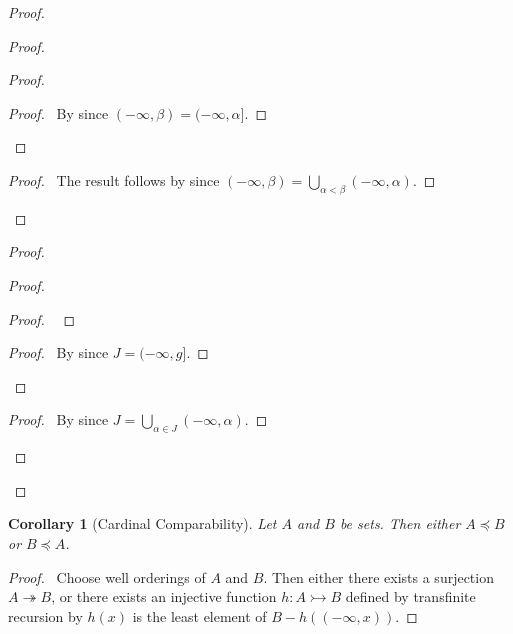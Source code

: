 \documentclass{book}
\let\qed\relax
\newtheorem{cor}{Corollary}[ax]
\theoremstyle{definition}
\begin{document}
\begin{proof}
\begin{proof}
	\begin{proof}
		\begin{proof}
			\pf\ By  since $(-\infty, \beta) = (-\infty, \alpha]$.
		\end{proof}
	\end{proof}
	\begin{proof}
		\pf\ The result follows by  since $(-\infty, \beta) = \bigcup_{\alpha < \beta} (-\infty, \alpha)$.
	\end{proof}
\end{proof}
\begin{proof}
	\begin{proof}
		\begin{proof}
			\pf\ 
		\end{proof}
		\begin{proof}
			\pf\ By  since $J = (-\infty, g]$.
		\end{proof}
	\end{proof}
	\begin{proof}
		\pf\ By  since $J = \bigcup_{\alpha \in J} (-\infty, \alpha)$.
	\end{proof}
\end{proof}
\qed
\end{proof}

\begin{cor}[Cardinal Comparability]
Let $A$ and $B$ be sets. Then either $A \preccurlyeq B$ or $B \preccurlyeq A$.
\end{cor}

\begin{proof}
\pf\ Choose well orderings of $A$ and $B$. Then either there exists a surjection $A \twoheadrightarrow B$, or there exists an injective function $h : A \rightarrowtail B$ defined by transfinite recursion by $h(x)$ is the least element of $B - h((-\infty, x))$. \qed
\end{proof}
\end{document}
